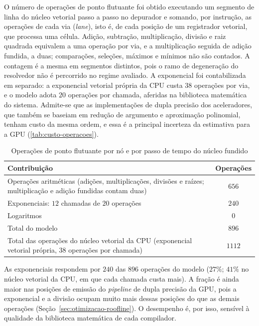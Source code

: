O número de operações de ponto flutuante foi obtido executando um segmento de linha do núcleo vetorial passo a passo no depurador e somando, por instrução, as operações de cada via (\textit{lane}), isto é, de cada posição de um registrador vetorial, que processa uma célula. %
Adição, subtração, multiplicação, divisão e raiz quadrada equivalem a uma operação por via, e a multiplicação seguida de adição fundida, a duas; comparações, seleções, máximos e mínimos não são contados.
A contagem é a mesma em segmentos distintos, pois o ramo de degeneração do resolvedor não é percorrido no regime avaliado.
A exponencial foi contabilizada em separado: a exponencial vetorial própria da CPU custa $38$ operações por via, e o modelo adota $20$ operações por chamada, aferidas na biblioteca matemática do sistema.
Admite-se que as implementações de dupla precisão dos aceleradores, que também se baseiam em redução de argumento e aproximação polinomial, tenham custo da mesma ordem, e essa é a principal incerteza da estimativa para a GPU (\autoref{tab:custo-operacoes}).

\begin{table}[H]
    \centering
    \caption{Operações de ponto flutuante por nó e por passo de tempo do núcleo fundido}
    \label{tab:custo-operacoes}
    \begin{tabular}{>{\raggedright\arraybackslash}p{10.8cm}c}
        \toprule
        Contribuição & Operações \\
        \midrule
        Operações aritméticas (adições, multiplicações, divisões e raízes; multiplicação e adição fundidas contam duas) & $656$ \\
        Exponenciais: $12$ chamadas de $20$ operações & $240$ \\
        Logaritmos & $0$ \\
        \midrule
        Total do modelo & $896$ \\
        Total das operações do núcleo vetorial da CPU (exponencial vetorial própria, $38$ operações por chamada) & $1112$ \\
        \bottomrule
    \end{tabular}
\end{table}

As exponenciais respondem por $240$ das $896$ operações do modelo ($27\%$; $41\%$ no núcleo vetorial da CPU, em que cada chamada custa mais).
A fração é ainda maior nas posições de emissão do \textit{pipeline} de dupla precisão da GPU, pois a exponencial e a divisão ocupam muito mais dessas posições do que as demais operações (Seção~\ref{sec:otimizacao-roofline}).
O desempenho é, por isso, sensível à qualidade da biblioteca matemática de cada compilador.

